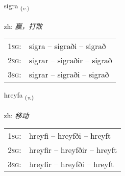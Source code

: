 \documentclass[frontgrid, backgrid]{flacards}\usepackage[]{graphicx}\usepackage[]{color}
\begin{document}
\renewcommand{\blhead}{\vskip5pt {\small\bfseries\footnotesize Sagnorð | 动词 }}
\renewcommand{\bcfoot}{\vskip5pt \hspace{2pt}{\small\bfseries\footnotesize 2K}}


{sigra \small{\textsubscript{(\textit{v.})}} \\[1ex] %
\textphonetic{[sɪɣra]} \\
zh: \emph{赢，打败} \\  [2ex]
\renewcommand*{\arraystretch}{0.8}
\begin{tabular}{p{1cm}l}
\textsc{1sg}: & sigra -- sigraði -- sigrað \\ 
\textsc{2sg}: & sigrar -- sigraðir -- sigrað \\ 
\textsc{3sg}: & sigrar -- sigraði -- sigrað \\ 
\end{tabular}
}

\renewcommand{\flhead}{\vskip5pt \fboxsep=0pt {\small\bfseries\footnotesize Sagnorð | 动词}}
\renewcommand{\fcfoot}{\vskip5pt \fboxsep=0pt \hspace{2pt}{\small\bfseries\footnotesize 2K}}

\renewcommand{\blhead}{\vskip5pt {\small\bfseries\footnotesize Sagnorð | 动词 }}
\renewcommand{\bcfoot}{\vskip5pt \hspace{2pt}{\small\bfseries\footnotesize 2K}}


{hreyfa \small{\textsubscript{(\textit{v.})}} \\[1ex] %
\textphonetic{[r̥eiːva]} \\
zh: \emph{移动} \\  [2ex]
\renewcommand*{\arraystretch}{0.8}
\begin{tabular}{p{1cm}l}
\textsc{1sg}: & hreyfi -- hreyfði -- hreyft \\ 
\textsc{2sg}: & hreyfir -- hreyfðir -- hreyft \\ 
\textsc{3sg}: & hreyfir -- hreyfði -- hreyft \\ 
\end{tabular}
}
\end{document}
